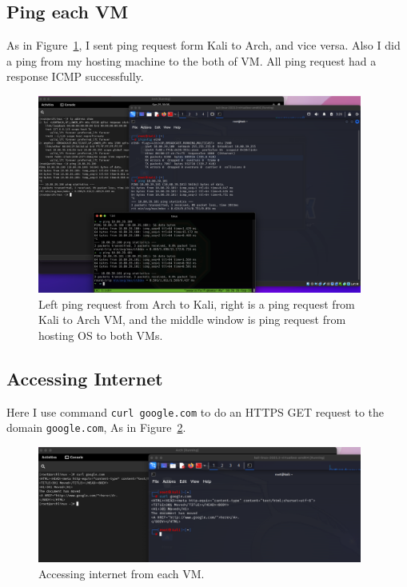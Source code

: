 \documentclass{article}
\def\c#1{\texttt{#1}}
\begin{document}
\subsection{Ping each VM}
As in Figure~\ref{fig:ping-vm}, I sent ping request form Kali to Arch, and vice versa. Also I did a ping from my hosting machine
to the both of VM. All ping request had a response ICMP successfully.

\begin{figure}[ht]
	\begin{center}
		\includegraphics[width=0.95\textwidth]{figures/ping-eachother.png}
	\end{center}
	\caption{Left ping request from Arch to Kali, right is a ping request from Kali to Arch VM, and the middle window is ping request from
		hosting OS to both VMs.}\label{fig:ping-vm}
\end{figure}

\subsection{Accessing Internet} %
\label{sub:Accessing Internet}
Here I use command \c{curl google.com} to do an HTTPS GET request to the domain \c{google.com}, As in Figure~\ref{fig:access-internet}.

\begin{figure}[ht]
	\begin{center}
		\includegraphics[width=0.95\textwidth]{figures/access-internet.png}
	\end{center}
	\caption{Accessing internet from each VM.}
	\label{fig:access-internet}
\end{figure}
\end{document}
